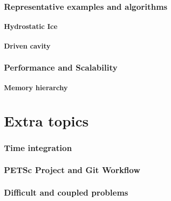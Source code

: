 \documentclass{beamer}
\begin{document}
\section{Representative examples and algorithms}
\subsection{Hydrostatic Ice}

\subsection{Driven cavity}



\section{Performance and Scalability}



\subsection{Memory hierarchy}









\part{Extra topics}


\section{Time integration}






\section{PETSc Project and Git Workflow}



\section{Difficult and coupled problems}





\end{document}
